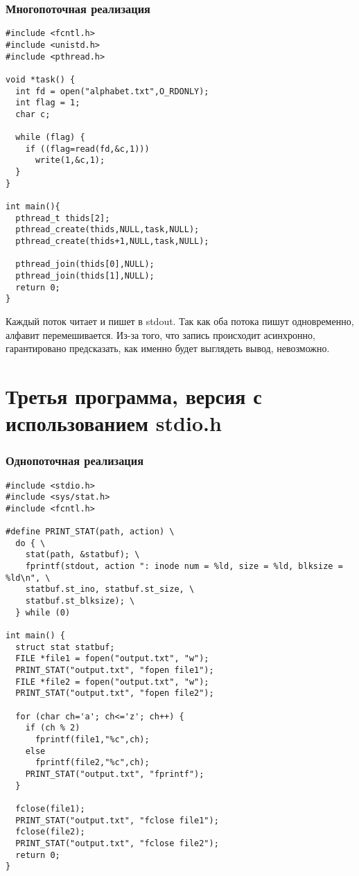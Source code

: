 \subsubsection{Многопоточная реализация}
\begin{lstlisting}
#include <fcntl.h>
#include <unistd.h>
#include <pthread.h>

void *task() {
  int fd = open("alphabet.txt",O_RDONLY);
  int flag = 1;
  char c;

  while (flag) {
    if ((flag=read(fd,&c,1)))
      write(1,&c,1);
  }
}

int main(){
  pthread_t thids[2];
  pthread_create(thids,NULL,task,NULL);
  pthread_create(thids+1,NULL,task,NULL);

  pthread_join(thids[0],NULL);
  pthread_join(thids[1],NULL);
  return 0;
}
\end{lstlisting}

Каждый поток читает и пишет в stdout. Так как оба потока пишут
одновременно, алфавит перемешивается. Из-за того, что запись происходит 
асинхронно, гарантировано предсказать, как именно будет выглядеть вывод, невозможно.

\section{Третья программа, версия с использованием stdio.h}


\subsubsection{Однопоточная реализация}
\begin{lstlisting}
#include <stdio.h>
#include <sys/stat.h>
#include <fcntl.h>

#define PRINT_STAT(path, action) \
  do { \
    stat(path, &statbuf); \
    fprintf(stdout, action ": inode num = %ld, size = %ld, blksize = %ld\n", \
    statbuf.st_ino, statbuf.st_size, \
    statbuf.st_blksize); \
  } while (0)

int main() {
  struct stat statbuf;
  FILE *file1 = fopen("output.txt", "w");
  PRINT_STAT("output.txt", "fopen file1");
  FILE *file2 = fopen("output.txt", "w");
  PRINT_STAT("output.txt", "fopen file2");

  for (char ch='a'; ch<='z'; ch++) {
    if (ch % 2)
      fprintf(file1,"%c",ch);
    else
      fprintf(file2,"%c",ch);
    PRINT_STAT("output.txt", "fprintf");
  }
  
  fclose(file1);
  PRINT_STAT("output.txt", "fclose file1");
  fclose(file2);
  PRINT_STAT("output.txt", "fclose file2");
  return 0;
}
\end{lstlisting}

